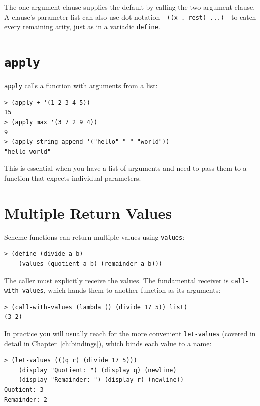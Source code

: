 The one-argument clause supplies the default by calling the two-argument clause. A clause's parameter list can also use dot notation---\texttt{((x . rest) ...)}---to catch every remaining arity, just as in a variadic \texttt{define}.

\section{\texttt{apply}}

\texttt{apply} calls a function with arguments from a list:

\begin{lstlisting}[style=repl]
> (apply + '(1 2 3 4 5))
15
> (apply max '(3 7 2 9 4))
9
> (apply string-append '("hello" " " "world"))
"hello world"
\end{lstlisting}

This is essential when you have a list of arguments and need to pass them to a function that expects individual parameters.

\section{Multiple Return Values}

Scheme functions can return multiple values using \texttt{values}:

\begin{lstlisting}[style=repl]
> (define (divide a b)
    (values (quotient a b) (remainder a b)))
\end{lstlisting}

The caller must explicitly receive the values. The fundamental receiver is \texttt{call-with-values}, which hands them to another function as its arguments:

\begin{lstlisting}[style=repl]
> (call-with-values (lambda () (divide 17 5)) list)
(3 2)
\end{lstlisting}

In practice you will usually reach for the more convenient \texttt{let-values} (covered in detail in Chapter~\ref{ch:bindings}), which binds each value to a name:

\begin{lstlisting}[style=repl]
> (let-values (((q r) (divide 17 5)))
    (display "Quotient: ") (display q) (newline)
    (display "Remainder: ") (display r) (newline))
Quotient: 3
Remainder: 2
\end{lstlisting}

